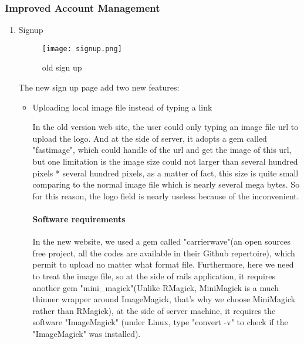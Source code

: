 \subsubsection{Improved Account Management}
\begin{enumerate}
\item{Signup}
\begin{figure}[h!]
\centering
\texttt{[image: signup.png]}
\caption{old sign up }
\label{fig-sample}
\end{figure}

The new sign up page add two new features:
\begin{itemize}
\item{Uploading local image file instead of typing a link}


In the old version web site, the user could only typing an image file url to upload the logo. And at the side of server, it adopts a gem called "fastimage", which could handle of the url and get the image of this url, but one limitation is the image size could not larger than several hundred pixels * several hundred pixels, as a matter of fact, this size is quite small comparing to the normal image file which is nearly several mega bytes. So for this reason, the logo field is nearly useless because of the inconvenient. 
\paragraph{Software requirements}
In the new website, we used a gem called "carrierwave"(an open sources free project, all the codes are available in their Github repertoire), which permit to upload no matter what format file. Furthermore, here we need to treat the image file, so at the side of rails application, it requires another gem "mini\_magick"(Unlike RMagick, MiniMagick is a much thinner wrapper around ImageMagick, that's why we choose MiniMagick rather than RMagick), at the side of server machine, it requires the software "ImageMagick" (under Linux, type "convert -v" to check if the "ImageMagick" was installed).

\end{itemize}
\end{enumerate}
